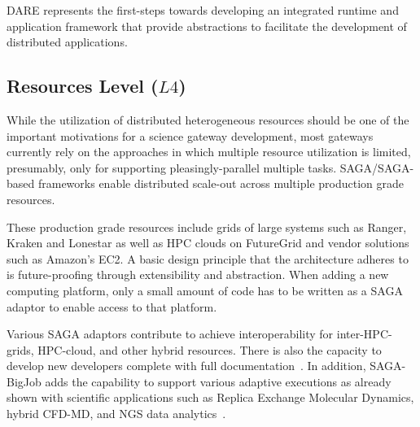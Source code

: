 \documentclass[]{svjour3}
\begin{document}
DARE represents the first-steps towards developing an integrated
runtime and application framework that provide abstractions to
facilitate the development of distributed applications.








\subsection{Resources Level ($L4$)} 

While the utilization of distributed heterogeneous resources should be
one of the important motivations for a science gateway development,
most gateways currently rely on the approaches in which multiple
resource utilization is limited, presumably, only for supporting
pleasingly-parallel multiple tasks.  SAGA/SAGA-based frameworks enable
distributed scale-out across multiple production grade resources.

These production grade resources include grids of large systems such
as Ranger, Kraken and Lonestar as well as HPC clouds on FutureGrid and
vendor solutions such as Amazon's EC2. A basic design principle that
the architecture adheres to is future-proofing through extensibility
and abstraction. When adding a new computing platform, only a small
amount of code has to be written as a SAGA adaptor to enable access to
that platform.

Various SAGA adaptors contribute to achieve interoperability for
inter-HPC-grids, HPC-cloud, and other hybrid resources. There is also
the capacity to develop new developers complete with full
documentation~\cite{saga_url}.  In addition, SAGA-BigJob adds the
capability to support various adaptive executions as already shown
with scientific applications such as Replica Exchange Molecular
Dynamics, hybrid CFD-MD, and NGS data
analytics~\cite{saga-royalsoc,coupled,ecmls11}.
\end{document}
